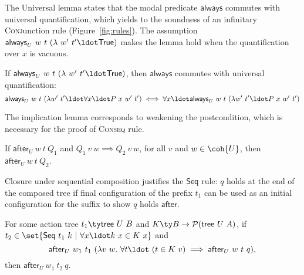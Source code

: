The Universal lemma states that the modal predicate $\mathsf{always}$
commutes with universal quantification, which yields to the soundness
of an infinitary \textsc{Conj}unction rule (Figure~\ref{fig:rules}). %
The assumption
$\mathsf{always}_U~w~t~(\lambda~w'~t'\ldot\mathsf{True})$ makes the
lemma hold when the quantification over $x$ is vacuous.

%

\begin{lemma}[Universal]
\label{lm:universal}
%
If $\mathsf{always}_U~w~t~(\lambda~w'~t'\ldot\mathsf{True})$, then
$\mathsf{always}$ commutes with universal quantification:
%
\[
\mathsf{always}_U~w~t~(\lambda w'~t' \ldot \forall x \ldot P~x~w'~t')
\iff
\forall x\ldot \mathsf{always}_U~w~t~(\lambda w'~t' \ldot P~x~w'~t')
\]  
\end{lemma}

The implication lemma corresponds to weakening the postcondition,
which is necessary for the proof of \textsc{Conseq} rule.


\begin{lemma}
\label{lm:aft-imp}
%
If $\mathsf{after}_U~w~t~Q_1$ and $Q_1~v~w \implies Q_2~v~w$, for all
$v$ and $w \in \coh{U}$, then $\mathsf{after}_U~w~t~Q_2$.  
\end{lemma}


Closure under sequential composition justifies the $\mathsf{Seq}$
rule: $q$ holds at the end of the composed tree if final configuration
of the prefix $t_1$ can be used as an initial configuration for the
suffix to show $q$ holds $\mathsf{after}$.


\begin{lemma}
\label{lm:aft-bnd}
%
For some action tree $t_1 \ty \mathsf{tree}~U~B$ and $K \ty B \to
\mathcal{P}(\mathsf{tree}~U~A)$, if $t_2 \in \set{\mathsf{Seq}~t_1~k
  ~|~ \forall x \ldot k~x \in K~x}$ and
\[
\mathsf{after}_U~w_1~t_1~(\lambda v~w. ~\forall t \ldot ~(t \in K~v)
\implies \mathsf{after}_U~w~t~q),
\]
then $\mathsf{after}_U~w_1~t_2~q$.
\end{lemma}

